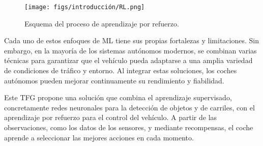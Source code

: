 \clearpage %

\begin{figure}[ht]
  \begin{center}
    \texttt{[image: figs/introducción/RL.png]}
  \end{center}
  \caption{Esquema del proceso de aprendizaje por refuerzo.}
  \label{rl}
\end{figure}

Cada uno de estos enfoques de \ac{ML} tiene sus propias fortalezas y limitaciones. Sin embargo, en la mayoría de los sistemas autónomos modernos, se combinan varias técnicas para garantizar que el vehículo pueda adaptarse a una amplia variedad de condiciones de tráfico y entorno. Al integrar estas soluciones, los coches autónomos pueden mejorar continuamente su rendimiento y fiabilidad.

Este \ac{TFG} propone una solución que combina el aprendizaje supervisado, concretamente redes neuronales para la detección de objetos y de carriles, con el aprendizaje por refuerzo para el control del vehículo. A partir de las observaciones, como los datos de los sensores, y mediante recompensas, el coche aprende a seleccionar las mejores acciones en cada momento.
